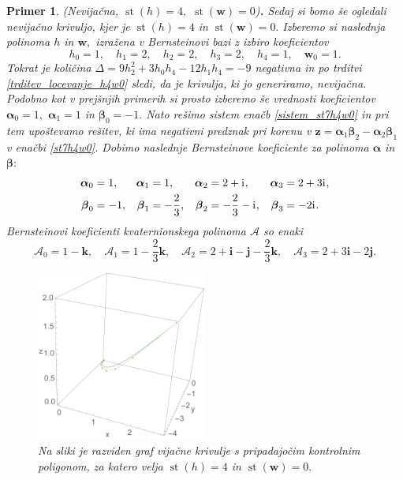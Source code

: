 \documentclass[12pt,a4paper,twoside]{article}
\newcommand{\iu}{\mathrm{i}\mkern1mu} %
\theoremstyle{definition} %
\theoremstyle{plain} %
\theoremstyle{primerstyle}
\newtheorem{primer}[definicija]{Primer}
\numberwithin{equation}{section}  %
\newcommand{\iV}{\mathbf{i}}
\newcommand{\jV}{\mathbf{j}}
\newcommand{\kV}{\mathbf{k}}
\newcommand{\wV}{\mathbf{w}}
\newcommand{\zV}{\mathbf{z}}
\newcommand{\AQ}{\mathcal{A}}
\newcommand{\balpha}{\boldsymbol \alpha}
\newcommand{\bbeta}{\boldsymbol \beta}
\DeclareMathOperator{\st}{st}
\begin{document}
\begin{primer}
	\textnormal{ }(Nevijačna, $\st(h)=4,$ $\st(\wV)=0$)\textbf{.}
	Sedaj si bomo še ogledali nevijačno krivuljo, kjer je $\st(h)=4$ in $\st(\wV)=0.$ Izberemo si naslednja polinoma $h$ in $\wV,$ izražena v Bernsteinovi bazi z izbiro koeficientov
	\begin{equation*}
		h_0=1,\quad h_1=2,\quad h_2=2,\quad h_3=2,\quad h_4=1,\quad \wV_0=1.
	\end{equation*}
	Tokrat je količina $\Delta=9h_2^2+3h_0h_4-12h_1h_4=-9$ negativna in po trditvi \ref{trditev_locevanje_h4w0} sledi, da je krivulja, ki jo generiramo, nevijačna. Podobno kot v prejšnjih primerih si prosto izberemo še vrednosti koeficientov $\balpha_0=1,$ $\balpha_1=1$ in $\bbeta_0=-1.$ Nato rešimo sistem enačb \eqref{sistem_st7h4w0} in pri tem upoštevamo rešitev, ki ima negativni predznak pri korenu v $\zV=\balpha_1\bbeta_2-\balpha_2\bbeta_1$ v enačbi \eqref{st7h4w0}. Dobimo naslednje Bernsteinove koeficiente za polinoma $\balpha$ in $\bbeta:$
	\begin{align*}
		\balpha_0&=1,&\balpha_1&=1,&\balpha_2&=2+\iu,&\balpha_3&=2+3\iu,\\
		\bbeta_0&=-1,&\bbeta_1&=-\frac{2}{3},&\bbeta_2&=-\frac{2}{3}-\iu,&\bbeta_3&=-2\iu.
	\end{align*}
	Bernsteinovi koeficienti kvaternionskega polinoma $\AQ$ so enaki
	\begin{equation*}
		\AQ_0=1-\kV,\quad\AQ_1=1-\frac{2}{3}\kV,\quad\AQ_2=2+\iV-\jV-\frac{2}{3}\kV,\quad\AQ_3=2+3\iV-2\jV.
	\end{equation*}
	\begin{figure}[h]
	  \centering
	  \includegraphics[width=0.5\textwidth]{images/h4w0_nevijacna.pdf}
	  \caption[Primer nevijačne krivulje ($\st(h)=4,$ $\st(\wV)=0$)]{Na sliki je razviden graf vijačne krivulje s pripadajočim kontrolnim poligonom, za katero velja $\st(h)=4$ in $\st(\wV)=0.$}
	  \label{fig:h4w0_nevijacna}
	\end{figure}
	

\end{primer}
\end{document}
